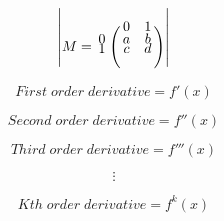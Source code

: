 \documentclass[a4paper,12pt]{article}
\begin{document}
\begin{center}
\color{orange}
\[
	\begin{vmatrix}
	M=\bordermatrix{~ & 0 & 1 \cr
	0 & a & b \cr
	1 & c & d \cr}
	\end{vmatrix}
\]

\color{blue}
\[
	First \;  order \; derivative = f'(x) %
\]

\[
	Second \; order \; derivative = f''(x) %
\]

\[
	Third \; order \; derivative = f'''(x)
\]

\[
	\vdots
\]

\[
	Kth \; order \; derivative =f^{k}(x)
\]
\end{center}
\end{document}
